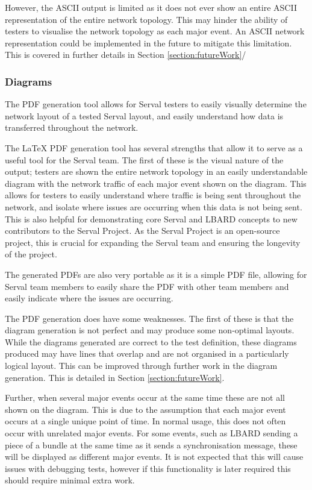 However, the ASCII output is limited as it does not ever show an entire ASCII representation of the entire network topology.
This may hinder the ability of testers to visualise the network topology as each major event.
An ASCII network representation could be implemented in the future to mitigate this limitation.
This is covered in further details in Section \ref{section:futureWork}/

\subsubsection{Diagrams}
The PDF generation tool allows for Serval testers to easily visually determine the network layout of a tested Serval layout, and easily understand how data is transferred throughout the network.

The LaTeX PDF generation tool has several strengths that allow it to serve as a useful tool for the Serval team.
The first of these is the visual nature of the output; testers are shown the entire network topology in an easily understandable diagram with the network traffic of each major event shown on the diagram.
This allows for testers to easily understand where traffic is being sent throughout the network, and isolate where issues are occurring when this data is not being sent.
This is also helpful for demonstrating core Serval and LBARD concepts to new contributors to the Serval Project.
As the Serval Project is an open-source project, this is crucial for expanding the Serval team and ensuring the longevity of the project.

The generated PDFs are also very portable as it is a simple PDF file, allowing for Serval team members to easily share the PDF with other team members and easily indicate where the issues are occurring.

The PDF generation does have some weaknesses.
The first of these is that the diagram generation is not perfect and may produce some non-optimal layouts.
While the diagrams generated are correct to the test definition, these diagrams produced may have lines that overlap and are not organised in a particularly logical layout.
This can be improved through further work in the diagram generation.
This is detailed in Section \ref{section:futureWork}.

Further, when several major events occur at the same time these are not all shown on the diagram.
This is due to the assumption that each major event occurs at a single unique point of time.
In normal usage, this does not often occur with unrelated major events.
For some events, such as LBARD sending a piece of a bundle at the same time as it sends a synchronisation message, these will be displayed as different major events.
It is not expected that this will cause issues with debugging tests, however if this functionality is later required this should require minimal extra work.

